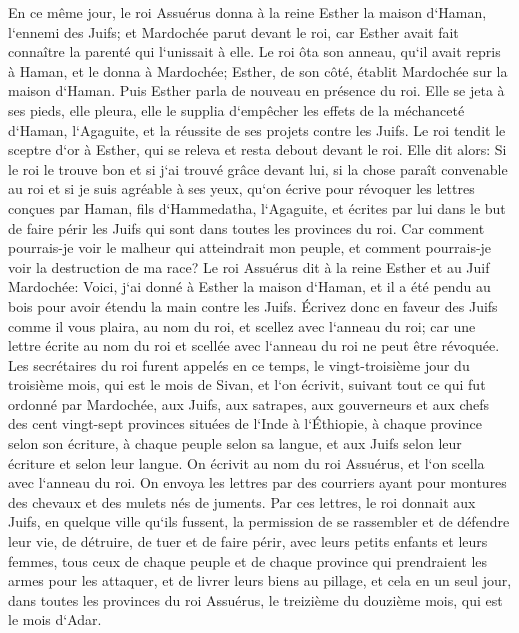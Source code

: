 \verse En ce même jour, le roi Assuérus donna à la reine Esther la maison d`Haman, l`ennemi des Juifs; et Mardochée parut devant le roi, car Esther avait fait connaître la parenté qui l`unissait à elle. 
\verse Le roi ôta son anneau, qu`il avait repris à Haman, et le donna à Mardochée; Esther, de son côté, établit Mardochée sur la maison d`Haman. 
\verse Puis Esther parla de nouveau en présence du roi. Elle se jeta à ses pieds, elle pleura, elle le supplia d`empêcher les effets de la méchanceté d`Haman, l`Agaguite, et la réussite de ses projets contre les Juifs. 
\verse Le roi tendit le sceptre d`or à Esther, qui se releva et resta debout devant le roi. 
\verse Elle dit alors: Si le roi le trouve bon et si j`ai trouvé grâce devant lui, si la chose paraît convenable au roi et si je suis agréable à ses yeux, qu`on écrive pour révoquer les lettres conçues par Haman, fils d`Hammedatha, l`Agaguite, et écrites par lui dans le but de faire périr les Juifs qui sont dans toutes les provinces du roi. 
\verse Car comment pourrais-je voir le malheur qui atteindrait mon peuple, et comment pourrais-je voir la destruction de ma race? 
\verse Le roi Assuérus dit à la reine Esther et au Juif Mardochée: Voici, j`ai donné à Esther la maison d`Haman, et il a été pendu au bois pour avoir étendu la main contre les Juifs. 
\verse Écrivez donc en faveur des Juifs comme il vous plaira, au nom du roi, et scellez avec l`anneau du roi; car une lettre écrite au nom du roi et scellée avec l`anneau du roi ne peut être révoquée. 
\verse Les secrétaires du roi furent appelés en ce temps, le vingt-troisième jour du troisième mois, qui est le mois de Sivan, et l`on écrivit, suivant tout ce qui fut ordonné par Mardochée, aux Juifs, aux satrapes, aux gouverneurs et aux chefs des cent vingt-sept provinces situées de l`Inde à l`Éthiopie, à chaque province selon son écriture, à chaque peuple selon sa langue, et aux Juifs selon leur écriture et selon leur langue. 
\verse On écrivit au nom du roi Assuérus, et l`on scella avec l`anneau du roi. On envoya les lettres par des courriers ayant pour montures des chevaux et des mulets nés de juments. 
\verse Par ces lettres, le roi donnait aux Juifs, en quelque ville qu`ils fussent, la permission de se rassembler et de défendre leur vie, de détruire, de tuer et de faire périr, avec leurs petits enfants et leurs femmes, tous ceux de chaque peuple et de chaque province qui prendraient les armes pour les attaquer, et de livrer leurs biens au pillage, 
\verse et cela en un seul jour, dans toutes les provinces du roi Assuérus, le treizième du douzième mois, qui est le mois d`Adar. 
